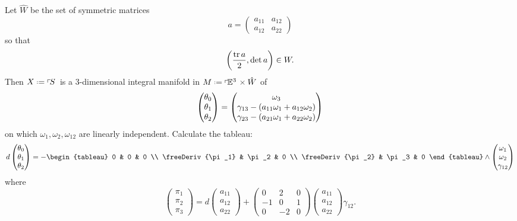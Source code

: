 Let \(\hat{W}\) be the set of symmetric matrices
\[
a=
\begin{pmatrix}
a_{11}&a_{12}\\
a_{12}&a_{22}
\end{pmatrix}
\]
so that 
\[
\left(\frac{\operatorname{tr} a}{2},\det a\right) \in W.
\]
Then \(X\defeq\frameBundle{S}\) is a \(3\)-dimensional integral manifold in \(M\defeq\frameBundleE{3} \times \hat{W}\) of
\[
\begin{pmatrix}
\theta_0 \\
\theta_1 \\
\theta_2
\end{pmatrix}
=
\begin{pmatrix}
\omega_3 \\
\gamma_{13} - \left(a_{11} \omega_1 + a_{12} \omega_2\right) \\
\gamma_{23} - \left(a_{21} \omega_1 + a_{22} \omega_2\right)
\end{pmatrix}
\]
on which \(\omega_1, \omega_2, \omega_{12}\) are linearly independent.
Calculate the tableau:
\[
d
\begin{pmatrix}
\theta_0 \\
\theta_1 \\
\theta_2
\end{pmatrix}
=
-
\begin{tableau}
0 & 0 & 0 \\
\freeDeriv{\pi_1} & \pi_2 & 0 \\
\freeDeriv{\pi_2} & \pi_3 & 0
\end{tableau}
\wedge
\begin{pmatrix}
\omega_1 \\
\omega_2 \\
\gamma_{12}
\end{pmatrix}
\]
where
\[
\begin{pmatrix}
\pi_1 \\
\pi_2 \\
\pi_3
\end{pmatrix}
=
d
\begin{pmatrix}
a_{11} \\
a_{12} \\
a_{22}
\end{pmatrix}
+
\begin{pmatrix}
0 & 2 & 0 \\
-1 & 0 & 1 \\
0 & -2 & 0 
\end{pmatrix}
\begin{pmatrix}
a_{11} \\
a_{12} \\
a_{22}
\end{pmatrix}
\gamma_{12}.
\]
